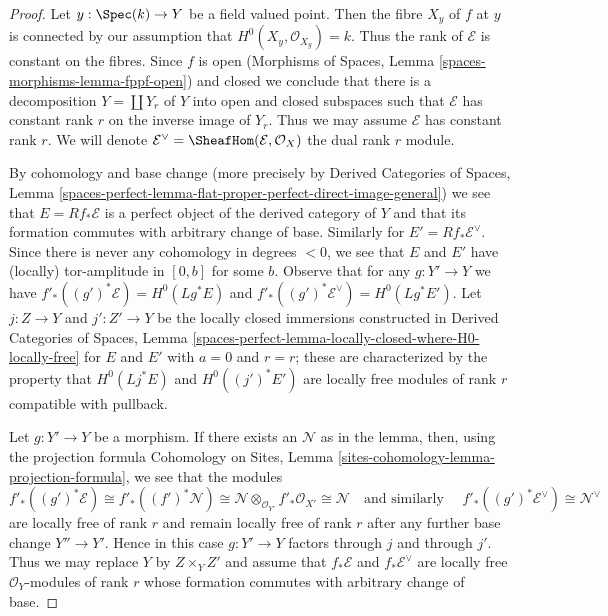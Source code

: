 \begin{proof}
Let $y : \Spec(k) \to Y$ be a field valued point.
Then the fibre $X_y$ of $f$ at $y$ is connected by our assumption
that $H^0(X_y, \mathcal{O}_{X_y}) = k$. Thus the rank of
$\mathcal{E}$ is constant on the fibres. Since $f$ is open
(Morphisms of Spaces, Lemma \ref{spaces-morphisms-lemma-fppf-open})
and closed we conclude that there is a decomposition $Y = \coprod Y_r$
of $Y$ into open and closed subspaces such that $\mathcal{E}$
has constant rank $r$ on the inverse image of $Y_r$.
Thus we may assume $\mathcal{E}$ has constant rank $r$.
We will denote $\mathcal{E}^\vee = \SheafHom(\mathcal{E}, \mathcal{O}_X)$
the dual rank $r$ module.

\medskip\noindent
By cohomology and base change (more precisely by
Derived Categories of Spaces, Lemma
\ref{spaces-perfect-lemma-flat-proper-perfect-direct-image-general})
we see that $E = Rf_*\mathcal{E}$ is a perfect object of the
derived category of $Y$ and that its formation commutes with
arbitrary change of base. Similarly for $E' = Rf_*\mathcal{E}^\vee$.
Since there is never any cohomology in degrees $< 0$, we see that
$E$ and $E'$ have (locally) tor-amplitude in $[0, b]$ for some $b$.
Observe that for any $g : Y' \to Y$ we have
$f'_*((g')^*\mathcal{E}) = H^0(Lg^*E)$ and
$f'_*((g')^*\mathcal{E}^\vee) = H^0(Lg^*E')$.
Let $j : Z \to Y$ and $j' : Z' \to Y$ be the locally closed
immersions constructed in Derived Categories of Spaces, Lemma
\ref{spaces-perfect-lemma-locally-closed-where-H0-locally-free}
for $E$ and $E'$ with $a = 0$ and $r = r$; these are characterized
by the property that $H^0(Lj^*E)$ and $H^0((j')^*E')$
are locally free modules of rank $r$ compatible with pullback.

\medskip\noindent
Let $g : Y' \to Y$ be a morphism. If there exists an $\mathcal{N}$
as in the lemma, then, using the projection formula
Cohomology on Sites, Lemma \ref{sites-cohomology-lemma-projection-formula},
we see that the modules
$$
f'_*((g')^*\mathcal{E}) \cong
f'_*((f')^*\mathcal{N}) \cong
\mathcal{N} \otimes_{\mathcal{O}_{Y'}} f'_*\mathcal{O}_{X'} \cong
\mathcal{N}\quad\text{and similarly }\quad
f'_*((g')^*\mathcal{E}^\vee) \cong \mathcal{N}^\vee
$$
are locally free of rank $r$ and remain locally free of rank $r$
after any further base change $Y'' \to Y'$.
Hence in this case $g : Y' \to Y$ factors through $j$ and through $j'$.
Thus we may replace $Y$ by $Z \times_Y Z'$ and assume that
$f_*\mathcal{E}$ and $f_*\mathcal{E}^\vee$ are locally free
$\mathcal{O}_Y$-modules of rank $r$
whose formation commutes with arbitrary change of base.


\end{proof}
